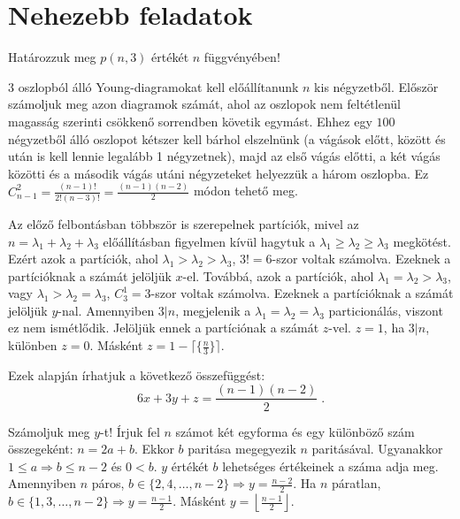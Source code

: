 \section*{Nehezebb feladatok}
\begin{extraproblem}
Határozzuk meg $p(n,3)$ értékét $n$ függvényében! 
\end{extraproblem}
\begin{solution}
$3$ oszlopból álló Young-diagramokat kell előállítanunk $n$ kis
négyzetből. Először számoljuk meg azon diagramok számát, ahol az oszlopok
nem feltétlenül magasság szerinti csökkenő sorrendben követik egymást.
Ehhez egy $100$ négyzetből álló oszlopot kétszer kell bárhol elszelnünk
(a vágások előtt, között és után is kell lennie legalább 1 négyzetnek),
majd az első vágás előtti, a két vágás közötti és a második vágás
utáni négyzeteket helyezzük a három oszlopba. Ez $C_{n-1}^{2}=\frac{(n-1)!}{2!(n-3)!}=\frac{(n-1)(n-2)}{2}$
módon tehető meg.

Az előző felbontásban többször is szerepelnek partíciók, mivel az
$n=\lambda_{1}+\lambda_{2}+\lambda_{3}$ előállításban figyelmen kívül
hagytuk a $\lambda_{1}\ge\lambda_{2}\ge\lambda_{3}$ megkötést. Ezért
azok a partíciók, ahol $\lambda_{1}>\lambda_{2}>\lambda_{3}$, $3!=6$-szor
voltak számolva. Ezeknek a partícióknak a számát jelöljük $x$-el.
Továbbá, azok a partíciók, ahol $\lambda_{1}=\lambda_{2}>\lambda_{3}$,
vagy $\lambda_{1}>\lambda_{2}=\lambda_{3}$, $C_{3}^{1}=3$-szor voltak
számolva. Ezeknek a partícióknak a számát jelöljük $y$-nal. Amennyiben
$3|n$, megjelenik a $\lambda_{1}=\lambda_{2}=\lambda_{3}$ particionálás,
viszont ez nem ismétlődik. Jelöljük ennek a partíciónak a számát $z$-vel.
$z=1$, ha $3|n$, különben $z=0$. Másként $z=1-\lceil\{\frac{n}{3}\}\rceil$.

Ezek alapján írhatjuk a következő összefüggést: 
\begin{equation}
6x+3y+z=\frac{(n-1)(n-2)}{2}\;.\label{eq:ismetelt_megszamlalas}
\end{equation}

Számoljuk meg $y$-t! Írjuk fel $n$ számot két egyforma és egy különböző
szám összegeként: $n=2a+b$. Ekkor $b$ paritása megegyezik $n$ paritásával.
Ugyanakkor $1\le a\Rightarrow b\le n-2$ és $0<b$. $y$ értékét $b$
lehetséges értékeinek a száma adja meg. Amennyiben $n$ páros, $b\in\{2,4,\dots,n-2\}\Rightarrow y=\frac{n-2}{2}$.
Ha $n$ páratlan, $b\in\{1,3,\dots,n-2\}\Rightarrow y=\frac{n-1}{2}$.
Másként $y=\left\lfloor \frac{n-1}{2}\right\rfloor $.


\end{solution}
